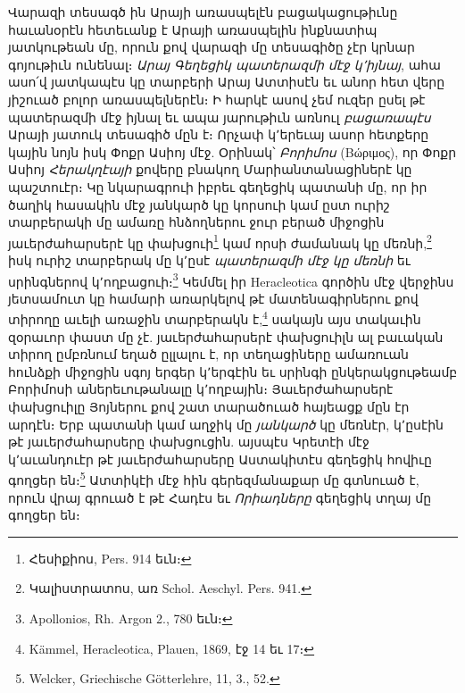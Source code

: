 \documentclass{article}
\begin{document}
{Վարազի տեսագծ ին Արայի առասպելէն բացակացութիւնը հաւանօրէն հետեւանք է Արայի առասպելին ինքնատիպ յատկութեան մը, որուն քով վարազի մը տեսագիծը չէր կրնար գոյութիւն ունենալ։ \emph{Արայ Գեղեցիկ պատերազմի մէջ կ՚իյնայ}, ահա ասո՛վ յատկապէս կը տարբերի Արայ Ատտիսէն եւ անոր հետ վերը յիշուած բոլոր առասպելներէն։ Ի հարկէ ասով չեմ ուզեր ըսել թէ պատերազմի մէջ իյնալ եւ ապա յարութիւն առնուլ \emph{բացառապէս} Արայի յատուկ տեսագիծ մըն է։ Որչափ կ՚երեւայ ասոր հետքերը կային նոյն իսկ Փոքր Ասիոյ մէջ. Օրինակ՝ \emph{Բորիմոս} (Βώριμος), որ Փոքր Ասիոյ \emph{Հերակղէայի} քովերը բնակող Մարիանտանացիներէ կը պաշտուէր։ Կը նկարագրուի իբրեւ գեղեցիկ պատանի մը, որ իր ծաղիկ հասակին մէջ յանկարծ կը կորսուի կամ ըստ ուրիշ տարբերակի մը ամառը հնձողներու ջուր բերած միջոցին յաւերժահարսերէ կը փախցուի\footnote{Հեսիքիոս, Pers. 914 եւն։} կամ որսի ժամանակ կը մեռնի,\footnote{Կալիստրատոս, առ Schol. Aeschyl. Pers. 941.} իսկ ուրիշ տարբերակ մը կ՚ըսէ \emph{պատերազմի մէջ կը մեռնի} եւ սրինգներով կ՚ողբացուի։\footnote{Apollonios, Rh. Argon 2., 780 եւն։} Կեմմել իր Heracleotica գործին մէջ վերջինս յետսամուտ կը համարի առարկելով թէ մատենագիրներու քով տիրողը աւելի առաջին տարբերակն է,\footnote{Kämmel, Heracleotica, Plauen, 1869, էջ 14 եւ 17։} սակայն այս տակաւին զօրաւոր փաստ մը չէ. յաւերժահարսերէ փախցուիլն ալ բաւական տիրող ըմբռնում եղած ըլլալու է, որ տեղացիները ամառուան հունձքի միջոցին սգոյ երգեր կ՚երգէին եւ սրինգի ընկերակցութեամբ Բորիմոսի աներեւութանալը կ՚ողբային։ Յաւերժահարսերէ փախցուիլը Յոյներու քով շատ տարածուած հայեացք մըն էր արդէն։ Երբ պատանի կամ աղջիկ մը \emph{յանկարծ} կը մեռնէր, կ՚ըսէին թէ յաւերժահարսերը փախցուցին. այսպէս Կրետէի մէջ կ՚աւանդուէր թէ յաւերժահարսերը Աստակիտէս գեղեցիկ հովիւը գողցեր են։\footnote{Welcker, Griechische Götterlehre, 11, 3., 52.} Ատտիկէի մէջ հին գերեզմանաքար մը գտնուած է, որուն վրայ գրուած է թէ Հադէս եւ \emph{Որիադները} գեղեցիկ տղայ մը գողցեր են։

}
\end{document}

